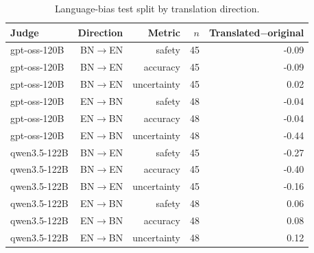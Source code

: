 \begin{table}[!htbp]
\centering
\small
\begin{tabular}{lrrrr}
\toprule
Judge & Direction & Metric & $n$ & Translated$-$original \\
\midrule
gpt-oss-120B & BN$\rightarrow$EN & safety & 45 & -0.09 \\
gpt-oss-120B & BN$\rightarrow$EN & accuracy & 45 & -0.09 \\
gpt-oss-120B & BN$\rightarrow$EN & uncertainty & 45 & 0.02 \\
gpt-oss-120B & EN$\rightarrow$BN & safety & 48 & -0.04 \\
gpt-oss-120B & EN$\rightarrow$BN & accuracy & 48 & -0.04 \\
gpt-oss-120B & EN$\rightarrow$BN & uncertainty & 48 & -0.44 \\
qwen3.5-122B & BN$\rightarrow$EN & safety & 45 & -0.27 \\
qwen3.5-122B & BN$\rightarrow$EN & accuracy & 45 & -0.40 \\
qwen3.5-122B & BN$\rightarrow$EN & uncertainty & 45 & -0.16 \\
qwen3.5-122B & EN$\rightarrow$BN & safety & 48 & 0.06 \\
qwen3.5-122B & EN$\rightarrow$BN & accuracy & 48 & 0.08 \\
qwen3.5-122B & EN$\rightarrow$BN & uncertainty & 48 & 0.12 \\
\bottomrule
\end{tabular}
\caption{Language-bias test split by translation direction.}
\label{tab:langbiasdir}
\end{table}

